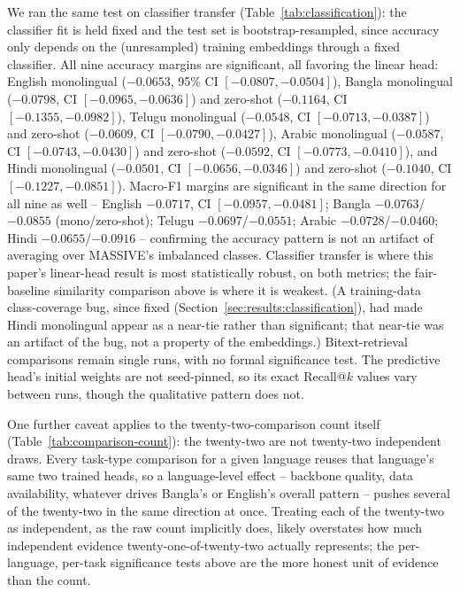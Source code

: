 \documentclass[manuscript]{acmart}
\begin{document}
We ran the same test on classifier transfer (Table~\ref{tab:classification}): the classifier fit is held fixed and the test set is bootstrap-resampled, since accuracy only depends on the (unresampled) training embeddings through a fixed classifier. All nine accuracy margins are significant, all favoring the linear head: English monolingual ($-0.0653$, 95\% CI $[-0.0807, -0.0504]$), Bangla monolingual ($-0.0798$, CI $[-0.0965, -0.0636]$) and zero-shot ($-0.1164$, CI $[-0.1355, -0.0982]$), Telugu monolingual ($-0.0548$, CI $[-0.0713, -0.0387]$) and zero-shot ($-0.0609$, CI $[-0.0790, -0.0427]$), Arabic monolingual ($-0.0587$, CI $[-0.0743, -0.0430]$) and zero-shot ($-0.0592$, CI $[-0.0773, -0.0410]$), and Hindi monolingual ($-0.0501$, CI $[-0.0656, -0.0346]$) and zero-shot ($-0.1040$, CI $[-0.1227, -0.0851]$). Macro-F1 margins are significant in the same direction for all nine as well -- English $-0.0717$, CI $[-0.0957,-0.0481]$; Bangla $-0.0763$/$-0.0855$ (mono/zero-shot); Telugu $-0.0697$/$-0.0551$; Arabic $-0.0728$/$-0.0460$; Hindi $-0.0655$/$-0.0916$ -- confirming the accuracy pattern is not an artifact of averaging over MASSIVE's imbalanced classes. Classifier transfer is where this paper's linear-head result is most statistically robust, on both metrics; the fair-baseline similarity comparison above is where it is weakest. (A training-data class-coverage bug, since fixed (Section~\ref{sec:results:classification}), had made Hindi monolingual appear as a near-tie rather than significant; that near-tie was an artifact of the bug, not a property of the embeddings.) Bitext-retrieval comparisons remain single runs, with no formal significance test. The predictive head's initial weights are not seed-pinned, so its exact Recall@$k$ values vary between runs, though the qualitative pattern does not.

One further caveat applies to the twenty-two-comparison count itself (Table~\ref{tab:comparison-count}): the twenty-two are not twenty-two independent draws. Every task-type comparison for a given language reuses that language's same two trained heads, so a language-level effect -- backbone quality, data availability, whatever drives Bangla's or English's overall pattern -- pushes several of the twenty-two in the same direction at once. Treating each of the twenty-two as independent, as the raw count implicitly does, likely overstates how much independent evidence twenty-one-of-twenty-two actually represents; the per-language, per-task significance tests above are the more honest unit of evidence than the count.
\end{document}
